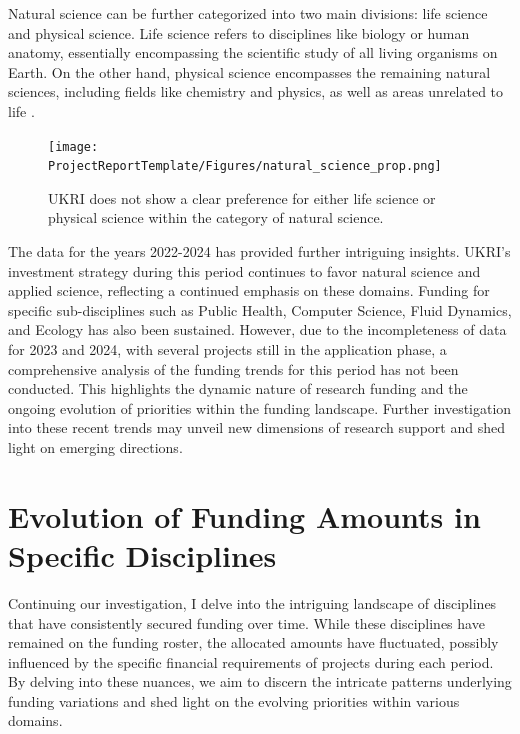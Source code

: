 Natural science can be further categorized into two main divisions: life science and physical science. Life science refers to disciplines like biology or human anatomy, essentially encompassing the scientific study of all living organisms on Earth. On the other hand, physical science encompasses the remaining natural sciences, including fields like chemistry and physics, as well as areas unrelated to life \citep{ledoux2002defining}.\\

\begin{figure}[H]
\centering
\texttt{[image: ProjectReportTemplate/Figures/natural\_science\_prop.png]}
\caption[Allocation of Funding in Natural Science]{UKRI does not show a clear preference for either life science or physical science within the category of natural science.}
\label{figure} 
\end{figure}

The data for the years 2022-2024 has provided further intriguing insights. UKRI's investment strategy during this period continues to favor natural science and applied science, reflecting a continued emphasis on these domains. Funding for specific sub-disciplines such as Public Health, Computer Science, Fluid Dynamics, and Ecology has also been sustained. However, due to the incompleteness of data for 2023 and 2024, with several projects still in the application phase, a comprehensive analysis of the funding trends for this period has not been conducted. This highlights the dynamic nature of research funding and the ongoing evolution of priorities within the funding landscape. Further investigation into these recent trends may unveil new dimensions of research support and shed light on emerging directions.\\


\section*{Evolution of Funding Amounts in Specific Disciplines}

Continuing our investigation, I delve into the intriguing landscape of disciplines that have consistently secured funding over time. While these disciplines have remained on the funding roster, the allocated amounts have fluctuated, possibly influenced by the specific financial requirements of projects during each period. By delving into these nuances, we aim to discern the intricate patterns underlying funding variations and shed light on the evolving priorities within various domains.\\

